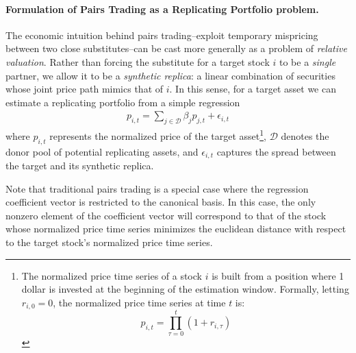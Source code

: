 \paragraph{
Formulation of \textsf{Pairs Trading} as a \textsf{Replicating Portfolio} problem.
}

The economic intuition behind pairs trading--exploit temporary mispricing between two close substitutes--can be cast more generally as a problem of \emph{relative valuation}.  Rather than forcing the substitute for a target stock $i$ to be a \emph{single} partner, we allow it to be a \emph{synthetic replica}: a linear combination of securities whose joint price path mimics that of $i$.
In this sense, for a target asset we can estimate a replicating portfolio from a simple regression
\begin{align}
\label{eq:regression}
p_{i,t} = \sum_{j \in \mathcal{D}} \beta_j p_{j,t} + \epsilon_{i,t}
\end{align}
where $p_{i,t}$ represents the normalized price of the target asset\footnote{
The normalized price time series of a stock $i$ is built from a position where 1 dollar is invested at the beginning of the estimation window. Formally, letting $r_{i,0}=0$, the normalized price time series at time $t$ is:
$$
p_{i,t} = \prod_{\tau=0}^t (1+r_{i,\tau} )
$$
}, $\mathcal{D}$ denotes the donor pool of potential replicating assets, and $\epsilon_{i,t}$ captures the spread between the target and its synthetic replica. 


Note that traditional pairs trading is a special case where the regression coefficient vector is restricted to the canonical basis. In this case, the only nonzero element of the coefficient vector will correspond to that of the stock whose normalized price time series minimizes the euclidean distance with respect to the target stock's normalized price time series.

